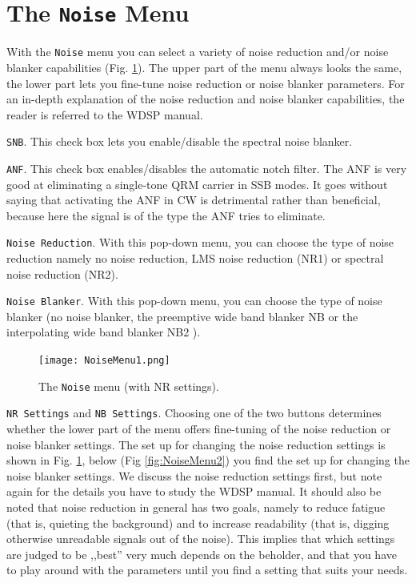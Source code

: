 \documentclass[12pt]{book}
\def\rett#1{\texttt{\color{red}#1}}
\def\bltt#1{\texttt{\color{blue}#1}}
\begin{document}
\section{The \texttt{Noise} Menu}



With the \bltt{Noise} menu you can select a variety of noise reduction and/or
noise blanker capabilities (Fig. \ref{fig:NoiseMenu1}). The upper part of the
menu always looks the same, the lower part lets you fine-tune noise reduction
or noise blanker parameters. For an in-depth explanation of the noise reduction
and noise blanker capabilities, the reader is referred to the WDSP manual.

\rett{SNB}. This check box lets you enable/disable the spectral noise blanker.

\rett{ANF}. This check box enables/disables the automatic notch filter. The ANF is
very good at eliminating a single-tone QRM carrier in SSB modes. It goes without
saying that activating the ANF in CW is detrimental rather than beneficial, because
here the signal is of the type the ANF tries to eliminate.

\rett{Noise Reduction}. With this pop-down menu, you can choose the type of noise reduction
namely no noise reduction, LMS noise reduction (NR1) or spectral noise reduction (NR2).

\rett{Noise Blanker}. With this pop-down menu, you can choose the type of noise blanker
(no noise blanker, the preemptive wide band blanker NB or the interpolating wide band
blanker NB2 ).

\begin{figure}[ht]
\center
\texttt{[image: NoiseMenu1.png]}
\caption{The \bltt{Noise} menu (with NR settings).}
\label{fig:NoiseMenu1}
\end{figure}

\rett{NR Settings} and \rett{NB Settings}. Choosing one of the two buttons determines whether the
lower part of the menu offers fine-tuning of the noise reduction or noise blanker settings.
The set up for changing the noise reduction settings is shown in Fig. \ref{fig:NoiseMenu1},
below (Fig \ref{fig:NoiseMenu2}) you find the set up for changing the noise blanker settings.
We discuss the noise reduction settings first, but note again for the details you have
to study the WDSP manual. It should also be noted that noise reduction in general has two
goals, namely to reduce fatigue (that is, quieting the background)
and to increase readability (that is, digging otherwise unreadable signals out of the noise).
This implies that which settings
are judged to be ,,best'' very much depends on the beholder,
and that you have to play around with the parameters until you find a setting that
suits your needs.
\end{document}
